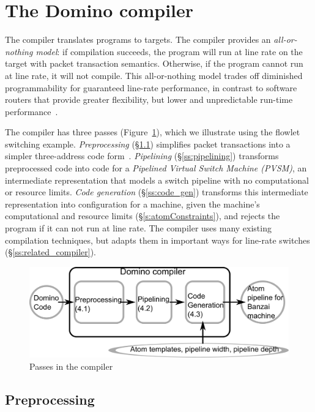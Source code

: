 \section{The Domino compiler}
\label{s:compiler}

The \pktlanguage compiler translates \pktlanguage programs to \absmachine
targets. The compiler provides an {\em all-or-nothing model}: if compilation
succeeds, the program will run at line rate on the target with packet
transaction semantics. Otherwise, if the program cannot run at line rate, it
will not compile. This all-or-nothing model trades off diminished
programmability for guaranteed line-rate performance, in contrast to software
routers that provide greater flexibility, but lower and unpredictable run-time
performance~\cite{dobrescu2012}.

The \pktlanguage compiler has three passes (Figure~\ref{fig:passes}), which we
illustrate using the flowlet switching example.  \textit{Preprocessing}
(\S\ref{ss:preprocessing}) simplifies packet transactions into a simpler
three-address code form~\cite{tac}.
\textit{Pipelining} (\S\ref{ss:pipelining}) transforms preprocessed code into
code for a \textit{Pipelined Virtual Switch Machine (PVSM)}, an intermediate
representation that models a switch pipeline with no computational or resource
limits. \textit{Code generation} (\S\ref{ss:code_gen}) transforms this
intermediate representation into configuration for a \absmachine machine, given
the machine's computational and resource limits (\S\ref{s:atomConstraints}),
and rejects the program if it can not run at line rate.  The \pktlanguage
compiler uses many existing compilation techniques, but adapts
them in important ways for line-rate switches (\S\ref{ss:related_compiler}).

\begin{figure}[!t]
  \includegraphics[width=\columnwidth]{compiler.pdf}
  \caption{Passes in the \pktlanguage compiler}
  \label{fig:passes}
\end{figure}

\subsection{Preprocessing}
\label{ss:preprocessing}

